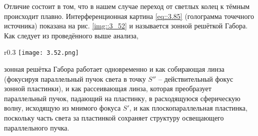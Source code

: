 Отличие состоит в том, что в нашем случае переход от светлых колец к тёмным происходит плавно. 
Интерференционная картина \eqref{eq::3.85} (голограмма точечного источника) показана на
рис. \ref{img::3_52} и называется зонной решёткой Габора. Как следует из проведённого выше анализа, 
\begin{wrapfigure}{r}{0.3\linewidth}
    \texttt{[image: 3.52.png]}
    \caption{Зависимость $I(\rho)$}
    \label{img::3_52}
\end{wrapfigure}
зонная решётка Габора работает одновременно и как собирающая линза (фокусируя параллельный пучок 
света в точку $S''$ -- действительный фокус зонной пластинки), и как рассеивающая линза, которая 
преобразует параллельный пучок, падающий на пластинку, в расходящуюся сферическую волну, исходящую из
мнимого фокуса $S'$, и как плоскопараллельная пластинка, поскольку часть света за пластинкой 
сохраняет структуру освещающего параллельного пучка.